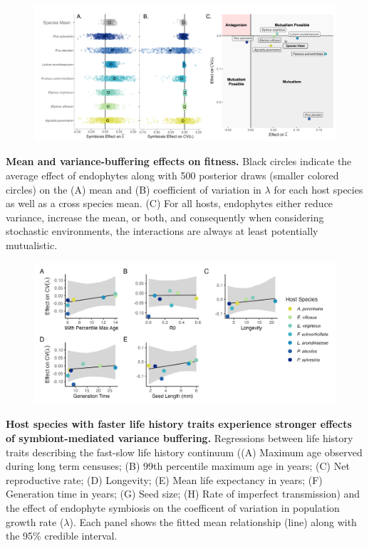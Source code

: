 \documentclass[12pt]{article}
\begin{document}
\begin{figure}
	\centering
	\includegraphics[width=\linewidth]{StochDemo_fig2.png}
\end{figure}
 \textbf{Mean and variance-buffering effects on fitness.} Black circles indicate the average effect of endophytes along with 500 posterior draws (smaller colored circles) on the (A) mean and (B) coefficient of variation in $\lambda$ for each host species as well as a cross species mean. (C) For all hosts, endophytes either reduce variance, increase the mean, or both, and consequently when considering stochastic environments, the interactions are always at least potentially mutualistic.
\newpage

\begin{figure}
	\centering
	\includegraphics[width=\linewidth]{StochDemo_fig3.png}
\end{figure}
 \textbf{Host species with faster life history traits experience stronger effects of symbiont-mediated variance buffering.} Regressions between life history traits describing the fast-slow life history continuum ((A) Maximum age observed during long term censuses; (B) 99th percentile maximum age in years; (C) Net reproductive rate; (D) Longevity; (E) Mean life expectancy in years; (F) Generation time in years; (G) Seed size; (H) Rate of imperfect transmission) and the effect of endophyte symbiosis on the coefficent of variation in population growth rate ($\lambda$). Each panel shows the fitted mean relationship (line) along with the 95\% credible interval.
\newpage
\end{document}
